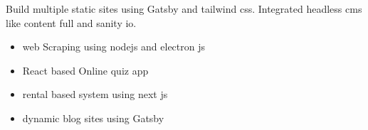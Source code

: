 \documentclass[]{junaid}
\begin{document}
\begin{minipage}[t]{0.66\textwidth}
 \descript
\noindent
\hspace{5em}%
\begin{minipage}{0.85\textwidth\vspace{5pt}}
Build multiple static sites using Gatsby and tailwind css. Integrated headless cms like content full and sanity io.
\end{minipage}
\sectionsep

\descript
\noindent
\hspace{5em}%
\begin{minipage}{0.85\textwidth\vspace{5pt}}
\begin{itemize}
\item{web Scraping using nodejs and electron js}
\item{React based Online quiz app}
\item{rental based system using next js}
\item{dynamic blog sites using Gatsby}
\end{itemize}
\end{minipage}
\end{minipage} 
\end{document}
